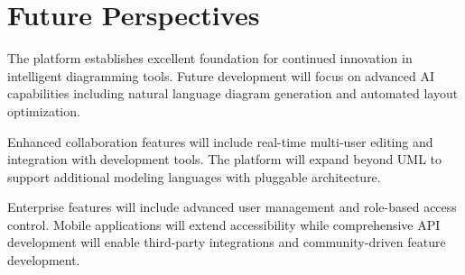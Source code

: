 \section{Future Perspectives}

The platform establishes excellent foundation for continued innovation in intelligent diagramming tools. Future development will focus on advanced AI capabilities including natural language diagram generation and automated layout optimization.

Enhanced collaboration features will include real-time multi-user editing and integration with development tools. The platform will expand beyond UML to support additional modeling languages with pluggable architecture.

Enterprise features will include advanced user management and role-based access control. Mobile applications will extend accessibility while comprehensive API development will enable third-party integrations and community-driven feature development.